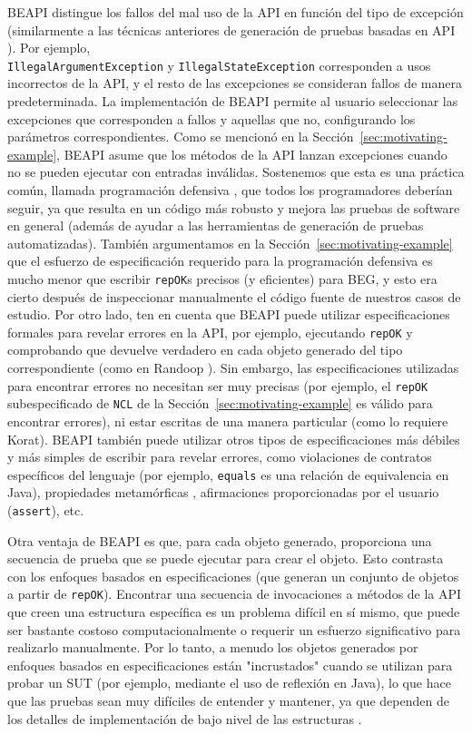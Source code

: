 \textsf{BEAPI} distingue los fallos del mal uso de la API en función del tipo de excepción (similarmente a las técnicas anteriores de generación de pruebas basadas en API \cite{Pacheco07}). Por ejemplo,\\
\texttt{IllegalArgumentException} y \texttt{IllegalStateException} corresponden a usos incorrectos de la API, y el resto de las excepciones se consideran fallos de manera predeterminada. La implementación de \textsf{BEAPI} permite al usuario seleccionar las excepciones que corresponden a fallos y aquellas que no, configurando los parámetros correspondientes. Como se mencionó en la Sección~\ref{sec:motivating-example}, \textsf{BEAPI} asume que los métodos de la API lanzan excepciones cuando no se pueden ejecutar con entradas inválidas. Sostenemos que esta es una práctica común, llamada programación defensiva \cite{Liskov00}, que todos los programadores deberían seguir, ya que resulta en un código más robusto y mejora las pruebas de software en general \cite{Ammann16} (además de ayudar a las herramientas de generación de pruebas automatizadas). También argumentamos en la Sección~\ref{sec:motivating-example} que el esfuerzo de especificación requerido para la programación defensiva es mucho menor que escribir \texttt{repOK}s precisos (y eficientes) para BEG, y esto era cierto después de inspeccionar manualmente el código fuente de nuestros casos de estudio. Por otro lado, ten en cuenta que \textsf{BEAPI} puede utilizar especificaciones formales para revelar errores en la API, por ejemplo, ejecutando \texttt{repOK} y comprobando que devuelve verdadero en cada objeto generado del tipo correspondiente (como en Randoop \cite{Pacheco07}). Sin embargo, las especificaciones utilizadas para encontrar errores no necesitan ser muy precisas (por ejemplo, el \texttt{repOK} subespecificado de \texttt{NCL} de la Sección~\ref{sec:motivating-example} es válido para encontrar errores), ni estar escritas de una manera particular (como lo requiere \textsf{Korat}). \textsf{BEAPI} también puede utilizar otros tipos de especificaciones más débiles y más simples de escribir para revelar errores, como violaciones de contratos específicos del lenguaje (por ejemplo, \texttt{equals} es una relación de equivalencia en Java), propiedades metamórficas \cite{Chen19}, afirmaciones proporcionadas por el usuario (\texttt{assert}), etc.

Otra ventaja de \textsf{BEAPI} es que, para cada objeto generado, proporciona una secuencia de prueba que se puede ejecutar para crear el objeto. Esto contrasta con los enfoques basados en especificaciones (que generan un conjunto de objetos a partir de \texttt{repOK}). Encontrar una secuencia de invocaciones a métodos de la API que creen una estructura específica es un problema difícil en sí mismo, que puede ser bastante costoso computacionalmente \cite{Braione17} o requerir un esfuerzo significativo para realizarlo manualmente. Por lo tanto, a menudo los objetos generados por enfoques basados en especificaciones están "incrustados" cuando se utilizan para probar un SUT (por ejemplo, mediante el uso de reflexión en Java), lo que hace que las pruebas sean muy difíciles de entender y mantener, ya que dependen de los detalles de implementación de bajo nivel de las estructuras \cite{Braione17}.

